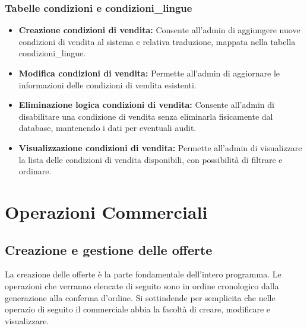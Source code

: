 \documentclass[12pt, a4paper]{article}
\begin{document}
\subsubsection{Tabelle condizioni e condizioni\_lingue}
\begin{itemize}
    \item \textbf{Creazione condizioni di vendita:} Consente all'admin di aggiungere nuove condizioni di vendita al sistema e relativa traduzione, mappata nella tabella condizioni\_lingue.
    \item \textbf{Modifica condizioni di vendita:} Permette all'admin di aggiornare le informazioni delle condizioni di vendita esistenti.
    \item \textbf{Eliminazione logica condizioni di vendita:} Consente all'admin di disabilitare una condizione di vendita senza eliminarla fisicamente dal database, mantenendo i dati per eventuali audit.
    \item \textbf{Visualizzazione condizioni di vendita:} Permette all'admin di visualizzare la lista delle condizioni di vendita disponibili, con possibilità di filtrare e ordinare.
\end{itemize}


\section{Operazioni Commerciali}
\subsection{Creazione e gestione delle offerte}
La creazione delle offerte è la parte fondamentale dell'intero programma.
Le operazioni che verranno elencate di seguito sono in ordine cronologico dalla generazione alla conferma d'ordine.
Si sottindende per semplicita che nelle operazio di seguito il commerciale
abbia la facoltà di creare, modificare e visualizzare.
\end{document}
